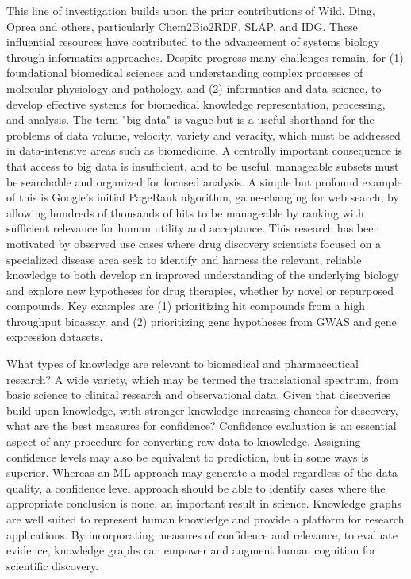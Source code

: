 This line of investigation builds upon the prior contributions of Wild, Ding, Oprea and others, particularly Chem2Bio2RDF\cite{Chen2010-to}, SLAP\cite{Chen2012-iq}, and IDG\cite{Oprea2018-cp}. These influential resources have contributed to the advancement of systems biology through informatics approaches.  Despite progress many challenges remain, for (1) foundational biomedical sciences and understanding complex processes of molecular physiology and pathology, and (2) informatics and data science, to develop effective systems for biomedical knowledge representation, processing, and analysis.  The term "big data" is vague but is a useful shorthand for the problems of data volume, velocity, variety and veracity, which must be addressed in data-intensive areas such as biomedicine.  A centrally important consequence is that access to big data is insufficient, and to be useful, manageable subsets must be searchable and organized for focused analysis.  A simple but profound example of this is Google's initial PageRank algorithm, game-changing for web search, by allowing hundreds of thousands of hits to be manageable by ranking with sufficient relevance for human utility and acceptance.  This research has been motivated by observed use cases where drug discovery scientists focused on a specialized disease area seek to identify and harness the relevant, reliable knowledge to both develop an improved understanding of the underlying biology and explore new hypotheses for drug therapies, whether by novel or repurposed compounds. Key examples are (1) prioritizing hit compounds from a high throughput bioassay, and (2) prioritizing gene hypotheses from GWAS and gene expression datasets.

What types of knowledge are relevant to biomedical and pharmaceutical research?  A wide variety, which may be termed the translational spectrum, from basic science to clinical research and observational data. Given that discoveries build upon knowledge, with stronger knowledge increasing chances for discovery, what are the best measures for confidence?  Confidence evaluation is an essential aspect of any procedure for converting raw data to knowledge.  Assigning confidence levels may also be equivalent to prediction, but in some ways is superior.  Whereas an ML approach may generate a model regardless of the data quality, a confidence level approach should be able to identify cases where the appropriate conclusion is none, an important result in science. Knowledge graphs are well suited to represent human knowledge and provide a platform for research applications. By incorporating measures of confidence and relevance, to evaluate evidence, knowledge graphs can empower and augment human cognition for scientific discovery.


